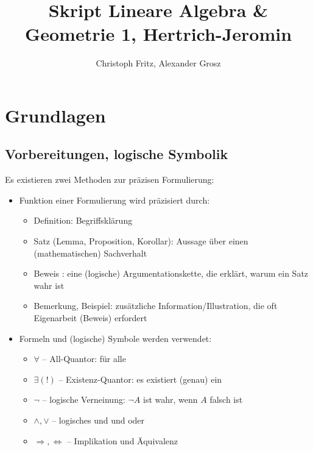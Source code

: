 \documentclass[12pt,a4paper,parskip=half-,DIV=15]{scrartcl}
\author{Christoph Fritz, Alexander Grosz}
\title{Skript Lineare Algebra \& Geometrie 1, Hertrich-Jeromin}
\begin{document}
\maketitle
\tableofcontents
\section{Grundlagen}
\subsection{Vorbereitungen, logische Symbolik}
Es existieren zwei Methoden zur präzisen Formulierung:
\begin{itemize}
\item Funktion einer Formulierung wird präzisiert durch: 
	\begin{itemize}
	\item Definition: Begriffsklärung
	\item Satz (Lemma, Proposition, Korollar): Aussage über einen (mathematischen) Sachverhalt
	\item Beweis : eine (logische) Argumentationskette, die erklärt, warum ein Satz wahr ist
	\item Bemerkung, Beispiel: zusätzliche Information/Illustration, die oft Eigenarbeit (Beweis) erfordert
	\end{itemize}
\item Formeln und (logische) Symbole werden verwendet:
	\begin{itemize}
	\item $\forall$ -- All-Quantor: \glqq für alle\grqq
	\item $\exists(!)$ -- Existenz-Quantor: \glqq es existiert (genau) ein\grqq
	\item $\lnot$ -- logische Verneinung: $\lnot A$ ist wahr, wenn $A$ falsch ist
	\item $\land ,\lor$ -- logisches \glqq und\grqq{} und \glqq oder\grqq
	\item $\Rightarrow ,\Leftrightarrow$ -- Implikation und Äquivalenz
	\end{itemize}
\end{itemize}
\end{document}
